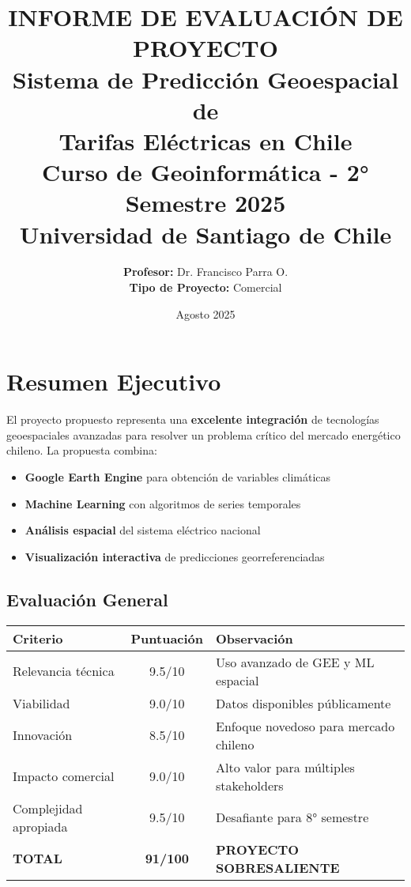 \documentclass[12pt,a4paper]{article}
\title{
    \Large{\textbf{INFORME DE EVALUACIÓN DE PROYECTO}}\\
    \vspace{0.5cm}
    \huge{\textbf{Sistema de Predicción Geoespacial de\\Tarifas Eléctricas en Chile}}\\
    \vspace{0.5cm}
    \large{Curso de Geoinformática - 2° Semestre 2025}\\
    \large{Universidad de Santiago de Chile}
}
\author{
    \textbf{Profesor:} Dr. Francisco Parra O.\\
    \textbf{Tipo de Proyecto:} Comercial
}
\date{Agosto 2025}
\begin{document}
\maketitle
\newpage

\tableofcontents
\newpage

\section{Resumen Ejecutivo}

El proyecto propuesto representa una \textbf{excelente integración} de tecnologías geoespaciales avanzadas para resolver un problema crítico del mercado energético chileno. La propuesta combina:

\begin{itemize}[leftmargin=*]
    \item \textbf{Google Earth Engine} para obtención de variables climáticas
    \item \textbf{Machine Learning} con algoritmos de series temporales
    \item \textbf{Análisis espacial} del sistema eléctrico nacional
    \item \textbf{Visualización interactiva} de predicciones georreferenciadas
\end{itemize}

\subsection{Evaluación General}
\begin{center}
\begin{tabular}{|l|c|l|}
\hline
\textbf{Criterio} & \textbf{Puntuación} & \textbf{Observación} \\
\hline
Relevancia técnica & 9.5/10 & Uso avanzado de GEE y ML espacial \\
Viabilidad & 9.0/10 & Datos disponibles públicamente \\
Innovación & 8.5/10 & Enfoque novedoso para mercado chileno \\
Impacto comercial & 9.0/10 & Alto valor para múltiples stakeholders \\
Complejidad apropiada & 9.5/10 & Desafiante para 8° semestre \\
\hline
\textbf{TOTAL} & \textbf{91/100} & \textbf{PROYECTO SOBRESALIENTE} \\
\hline
\end{tabular}
\end{center}
\end{document}

